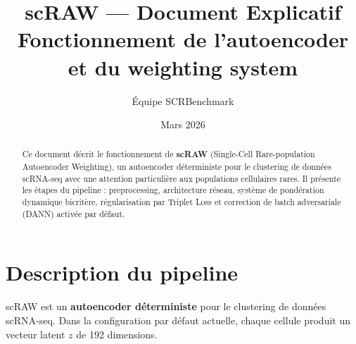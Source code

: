 \documentclass[11pt,a4paper]{article}
\title{\textbf{scRAW --- Document Explicatif}\\[4pt]
{\Large Fonctionnement de l'autoencoder et du weighting system}}
\author{\'Equipe SCRBenchmark}
\date{Mars 2026}
\begin{document}
\maketitle

\begin{abstract}
Ce document d\'ecrit le fonctionnement de \textbf{scRAW} (Single-Cell Rare-population Autoencoder Weighting), un autoencoder d\'eterministe pour le clustering de donn\'ees scRNA-seq avec une attention particuli\`ere aux populations cellulaires rares. Il pr\'esente les \'etapes du pipeline : preprocessing, architecture r\'eseau, syst\`eme de pond\'eration dynamique bicrit\`ere, r\'egularisation par Triplet Loss et correction de batch adversariale (DANN) activ\'ee par d\'efaut.
\end{abstract}

\vspace{0.5cm}
\tableofcontents
\newpage

\section{Description du pipeline}
\label{sec:pipeline}

scRAW est un \textbf{autoencoder d\'eterministe} pour le clustering de donn\'ees scRNA-seq. Dans la configuration par d\'efaut actuelle, chaque cellule produit un vecteur latent $z$ de 192 dimensions.
\end{document}

